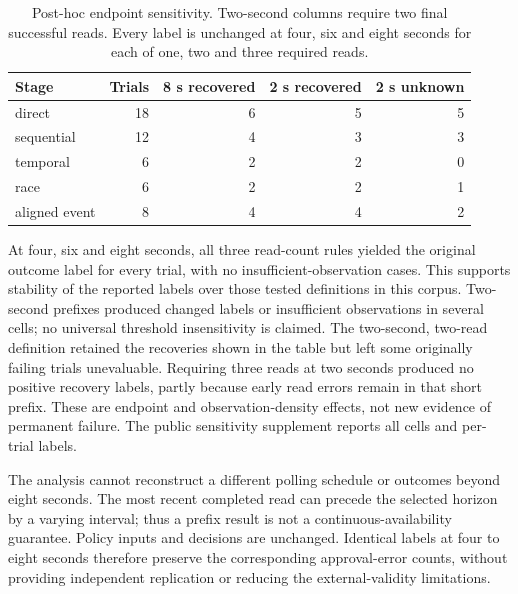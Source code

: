 \documentclass[manuscript,review,nonacm]{acmart}
\begin{document}
\begin{table}[t]
\caption{Post-hoc endpoint sensitivity. Two-second columns require two final successful reads. Every label is unchanged at four, six and eight seconds for each of one, two and three required reads.}
\label{tab:stage-5-5}
\centering
\begin{tabularx}{\linewidth}{@{}Xrrrr@{}}
\toprule
Stage & Trials & 8 s recovered & 2 s recovered & 2 s unknown \\
\midrule
direct & 18 & 6 & 5 & 5 \\
sequential & 12 & 4 & 3 & 3 \\
temporal & 6 & 2 & 2 & 0 \\
race & 6 & 2 & 2 & 1 \\
aligned event & 8 & 4 & 4 & 2 \\
\bottomrule
\end{tabularx}
\end{table}

At four, six and eight seconds, all three read-count rules yielded the original outcome label for every trial, with no insufficient-observation cases. This supports stability of the reported labels over those tested definitions in this corpus. Two-second prefixes produced changed labels or insufficient observations in several cells; no universal threshold insensitivity is claimed. The two-second, two-read definition retained the recoveries shown in the table but left some originally failing trials unevaluable. Requiring three reads at two seconds produced no positive recovery labels, partly because early read errors remain in that short prefix. These are endpoint and observation-density effects, not new evidence of permanent failure. The public sensitivity supplement reports all cells and per-trial labels.

The analysis cannot reconstruct a different polling schedule or outcomes beyond eight seconds. The most recent completed read can precede the selected horizon by a varying interval; thus a prefix result is not a continuous-availability guarantee. Policy inputs and decisions are unchanged. Identical labels at four to eight seconds therefore preserve the corresponding approval-error counts, without providing independent replication or reducing the external-validity limitations.
\end{document}

